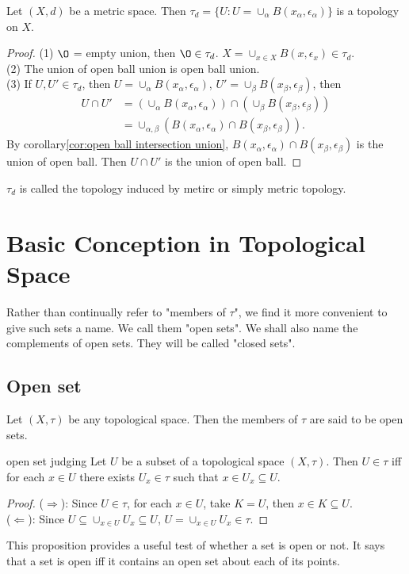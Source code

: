 \begin{proposition}{}{}
    Let $(X,d)$ be a metric space. Then $\tau_d=\{U: U=\cup_{\alpha} B(x_{\alpha}, \epsilon_{\alpha}) \}$ is a topology on $X$. 
\end{proposition}
\begin{proof}
    (1) $\O$ = empty union, then $\O\in \tau_d$. $X=\cup_{x\in X}B(x,\epsilon_{x})\in \tau_d$.\\
    (2) The union of open ball union is open ball union.\\
    (3) If $U,U'\in \tau_d$, then $U=\cup_{\alpha} B(x_{\alpha}, \epsilon_{\alpha})$, $U'=\cup_{\beta} B(x_{\beta}, \epsilon_{\beta})$, then
    \begin{align*}
        U\cap U' &= (\cup_{\alpha} B(x_{\alpha}, \epsilon_{\alpha}))\cap(\cup_{\beta} B(x_{\beta}, \epsilon_{\beta}))\\
                &= \cup_{\alpha,\beta} (B(x_{\alpha}, \epsilon_{\alpha})\cap B(x_{\beta}, \epsilon_{\beta})).
    \end{align*}
    By corollary\ref{cor:open ball intersection union}, $B(x_{\alpha}, \epsilon_{\alpha})\cap B(x_{\beta}, \epsilon_{\beta})$ is the union of open ball. 
    Then $U\cap U'$ is the union of open ball.
\end{proof}

$\tau_d$ is called the topology induced by metirc or simply metric topology. 

\section{Basic Conception in Topological Space}

Rather than continually refer to "members of $\tau$", we find it more convenient to give such sets a name. 
We call them "open sets". We shall also name the complements of open sets. They will be called "closed sets". 

\subsection{Open set}
\begin{definition}{}{}
    Let $(X,\tau)$ be any topological space. Then the members of $\tau$ are said to be open sets.
\end{definition}

\begin{proposition}{}{open set judging}
    Let $U$ be a subset of a topological space $(X,\tau)$.
    Then $U\in\tau$ iff for each $x\in U$ there exists $U_x\in\tau$ such that $x\in U_x\subseteq U$.
\end{proposition}
\begin{proof}
    ($\Rightarrow$): Since $U\in\tau$, for each $x\in U$, take $K=U$, then $x\in K\subseteq U$.\\
    ($\Leftarrow$): Since $U\subseteq \cup_{x\in U}U_x\subseteq U$, $U=\cup_{x\in U}U_x\in\tau$. 
\end{proof}
\begin{remark}
    This proposition provides a useful test of whether a set is open or not. 
    It says that a set is open iff it contains an open set about each of its points.
\end{remark}

